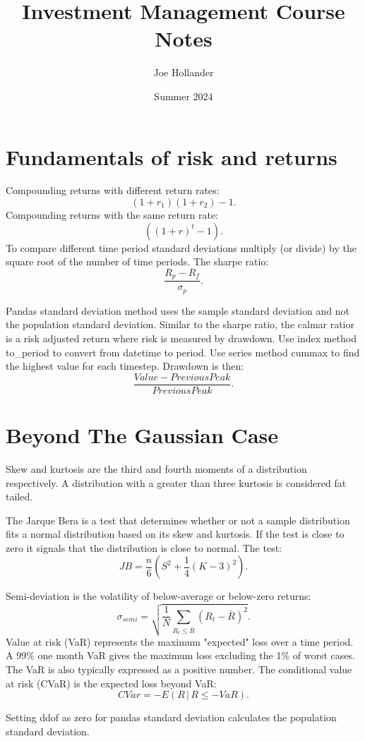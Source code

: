 \documentclass{article}
\title{Investment Management Course Notes}
\author{Joe Hollander}
\date{Summer 2024}
\begin{document}
\maketitle

\section[1.1]{Fundamentals of risk and returns}

Compounding returns with different return rates:
\[
(1 + r_1)(1 + r_2) - 1.
\]
Compounding returns with the same return rate:
\[
((1 + r)^t - 1). 
\]
To compare different time period standard deviations multiply (or divide)
by the square root of the number of time periods.
The sharpe ratio:
\[
\frac{R_p-R_f}{\sigma_p}.
\]

Pandas standard deviation method uses the sample
standard deviation and not the population standard
deviation. Similar to the sharpe ratio, the calmar
ratior is a risk adjusted return where risk is measured
by drawdown. Use index method to\_period to convert from
datetime to period. Use series method cummax to find the
highest value for each timestep. Drawdown is then: 
\[
\frac{Value - Previous Peak}{Previous Peak}.
\]

\section[1.2]{Beyond The Gaussian Case}

Skew and kurtosis are the third and fourth moments
of a distribution respectively. A distribution with
a greater than three kurtosis is considered fat tailed.

The Jarque Bera is a test that determines whether 
or not a sample distribution fits a normal distribution
based on its skew and kurtosis. If the test is close
to zero it signals that the distribution is close 
to normal. The test:
\[
JB = \frac{n}{6}\left(S^2 + \frac{1}{4}(K-3)^2\right).
\]

Semi-deviation is the volatility of below-average
or below-zero returns:
\[
\sigma_{semi} = 
\sqrt{\frac{1}{N}\sum_{R_t\le\bar{R}}(R_t-\bar{R})^2}.
\]
Value at risk (VaR) represents the maximum
"expected" loss over a time period. A 99\%
one month VaR gives the maximum loss excluding
the 1\% of worst cases. The VaR is also typically
expressed as a positive number. The conditional
value at risk (CVaR) is the expected loss beyond
VaR:
\[
CVar = -E(R \, | \, R \le -VaR).
\]

Setting ddof as zero for pandas standard deviation
calculates the population standard deviation.
\end{document}
